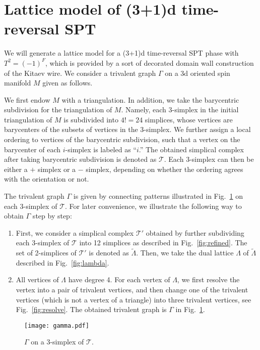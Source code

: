 \documentclass[12pt]{article}
\numberwithin{equation}{section}
\renewcommand{\tilde}{\widetilde}
\begin{document}
\section{Lattice model of (3+1)d time-reversal SPT}
\label{sec:3dt}
We will generate a lattice model for a (3+1)d time-reversal SPT phase with $T^2=(-1)^F$, which is provided by a sort of decorated domain wall construction of the Kitaev wire.
We consider a trivalent graph $\Gamma$ on a 3d oriented spin manifold $M$ given as follows. 

We first endow $M$ with a triangulation. In addition, we take the
barycentric subdivision for the triangulation of $M$. Namely, each 3-simplex in the initial triangulation of $M$ is subdivided into $4!=24$ simplices, whose vertices are barycenters of the subsets of vertices in the $3$-simplex. 
We further assign a local ordering to vertices of the barycentric subdivision, such that a vertex on the barycenter of each $i$-simplex is labeled as ``$i$.''
The obtained simplical complex after taking barycentric subdivision is denoted as $\mathcal{T}$.
Each 3-simplex can then be either a $+$ simplex or a $-$ simplex, depending on whether the ordering agrees with the orientation or not.

The trivalent graph $\Gamma$ is given by connecting patterns illustrated in Fig.~\ref{fig:gamma} on each 3-simplex of $\mathcal{T}$. For later convenience, we illustrate the following way to obtain $\Gamma$ step by step:

\begin{enumerate}
    \item First, we consider a simplical complex $\mathcal{T}'$ obtained by further subdividing each 3-simplex of $\mathcal{T}$ into 12 simplices as described in Fig.~\ref{fig:refined}. The set of 2-simplices of $\mathcal{T}'$ is denoted as $\tilde{\Lambda}$. Then, we take the dual lattice $\Lambda$ of $\tilde{\Lambda}$ described in Fig.~\ref{fig:lambda}.

    
    \item All vertices of $\Lambda$ have degree 4.
    For each vertex of $\Lambda$, we first resolve the vertex into a pair of trivalent vertices, and then change one of the trivalent vertices (which is not a vertex of a triangle) into three trivalent vertices, see Fig.~\ref{fig:resolve}. 
    The obtained trivalent graph is $\Gamma$ in Fig.~\ref{fig:gamma}. 
\end{enumerate}

\begin{figure}[htb]
\centering
\texttt{[image: gamma.pdf]}
\caption{$\Gamma$ on a 3-simplex of $\mathcal{T}$.}
\label{fig:gamma}
\end{figure}
\end{document}
